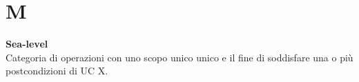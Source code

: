 \section{M}
\textbf{Sea-level}\\
Categoria di operazioni con uno scopo unico unico e il fine di soddisfare una o più postcondizioni di UC X.

\clearpage